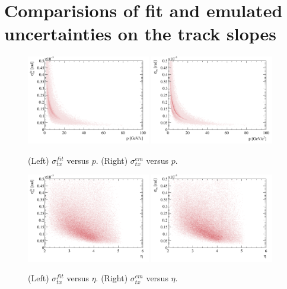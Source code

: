 \section{Comparisions of fit and emulated uncertainties on the track slopes}
\label{sec:slopeplots}
%
\begin{figure}[h!]
\centering
\includegraphics[width=0.48\textwidth]{figs/etx-fit.pdf}
\includegraphics[width=0.48\textwidth]{figs/etx-em.pdf}
\caption{(Left) $\sigma^{fit}_{tx}$ versus $p$. (Right)
  $\sigma^{em}_{tx}$ versus $p$.}
\label{fig:emtxp}
\end{figure}
%
\begin{figure}[h!]
\centering
\includegraphics[width=0.48\textwidth]{figs/etx-eta-fit.pdf}
\includegraphics[width=0.48\textwidth]{figs/etx-eta-em.pdf}
\caption{(Left) $\sigma^{fit}_{tx}$ versus $\eta$. (Right)
  $\sigma^{em}_{tx}$ versus $\eta$.}
\label{fig:emtxeta}
\end{figure}
